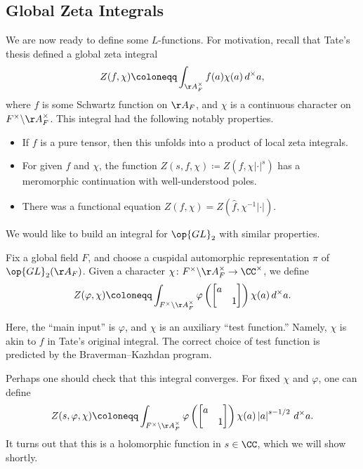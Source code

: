 \documentclass[../notes.tex]{subfiles}
\begin{document}
\subsection{Global Zeta Integrals}
We are now ready to define some $L$-functions. For motivation, recall that Tate's thesis defined a global zeta integral
\[Z(f,\chi)\coloneqq\int_{\AA_F^\times}f(a)\chi(a)\,d^\times a,\]
where $f$ is some Schwartz function on $\AA_F$, and $\chi$ is a continuous character on $F^\times\backslash\AA_F^\times$. This integral had the following notably properties.
\begin{itemize}
	\item If $f$ is a pure tensor, then this unfolds into a product of local zeta integrals.
	\item For given $f$ and $\chi$, the function $Z(s,f,\chi)\coloneqq Z\left(f,\chi\left|\cdot\right|^s\right)$ has a meromorphic continuation with well-understood poles.
	\item There was a functional equation $Z(f,\chi)=Z\left(\hat f,\chi^{-1}\left|\cdot\right|\right)$.
\end{itemize}
We would like to build an integral for $\op{GL}_2$ with similar properties.
\begin{definition}
	Fix a global field $F$, and choose a cuspidal automorphic representation $\pi$ of $\op{GL}_2(\AA_F)$. Given a character $\chi\colon F^\times\backslash\AA_F^\times\to\CC^\times$, we define
	\[Z(\varphi,\chi)\coloneqq\int_{F^\times\backslash\AA_F^\times}\varphi\left(\begin{bmatrix}
		a \\ & 1
	\end{bmatrix}\right)\chi(a)\,d^\times a.\]
\end{definition}
\begin{remark}
	Here, the ``main input'' is $\varphi$, and $\chi$ is an auxiliary ``test function.'' Namely, $\chi$ is akin to $f$ in Tate's original integral. The correct choice of test function is predicted by the Braverman--Kazhdan program.
\end{remark}
\begin{remark}
	Perhaps one should check that this integral converges. For fixed $\chi$ and $\varphi$, one can define
	\[Z(s,\varphi,\chi)\coloneqq\int_{F^\times\backslash\AA_F^\times}\varphi\left(\begin{bmatrix}
		a \\ & 1
	\end{bmatrix}\right)\chi(a)\left|a\right|^{s-1/2}\,d^\times a.\]
	It turns out that this is a holomorphic function in $s\in\CC$, which we will show shortly.
\end{remark}
\end{document}
